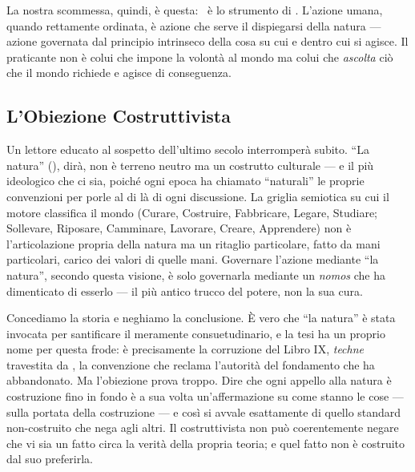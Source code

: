 La nostra scommessa, quindi, \`e questa: \praxis\ \`e lo strumento di
\physis. L'azione umana, quando rettamente ordinata, \`e azione che serve
il dispiegarsi della natura --- azione governata dal principio intrinseco
della cosa su cui e dentro cui si agisce. Il praticante non \`e colui che
impone la volont\`a al mondo ma colui che \emph{ascolta} ci\`o che il
mondo richiede e agisce di conseguenza.

\subsection{L'Obiezione Costruttivista}

Un lettore educato al sospetto dell'ultimo secolo interromper\`a subito.
``La natura'' (\physis), dir\`a, non \`e terreno neutro ma un costrutto
culturale --- e il pi\`u ideologico che ci sia, poich\'e ogni epoca ha
chiamato ``naturali'' le proprie convenzioni per porle al di l\`a di ogni
discussione. La griglia semiotica su cui il motore classifica il mondo
(Curare, Costruire, Fabbricare, Legare, Studiare; Sollevare, Riposare,
Camminare, Lavorare, Creare, Apprendere) non \`e l'articolazione propria
della natura ma un ritaglio particolare, fatto da mani particolari, carico
dei valori di quelle mani. Governare l'azione mediante ``la natura'', secondo
questa visione, \`e solo governarla mediante un \emph{nomos} che ha
dimenticato di esserlo --- il pi\`u antico trucco del potere, non la sua cura.

Concediamo la storia e neghiamo la conclusione. \`E vero che ``la natura'' \`e
stata invocata per santificare il meramente consuetudinario, e la tesi ha un
proprio nome per questa frode: \`e precisamente la corruzione del Libro IX,
\emph{techne} travestita da \physis, la convenzione che reclama l'autorit\`a
del fondamento che ha abbandonato. Ma l'obiezione prova troppo. Dire che ogni
appello alla natura \`e costruzione fino in fondo \`e a sua volta
un'affermazione su come stanno le cose --- sulla portata della costruzione ---
e cos\`i si avvale esattamente di quello standard non-costruito che nega agli
altri. Il costruttivista non pu\`o coerentemente negare che vi sia un fatto
circa la verit\`a della propria teoria; e quel fatto non \`e costruito dal suo
preferirla.

